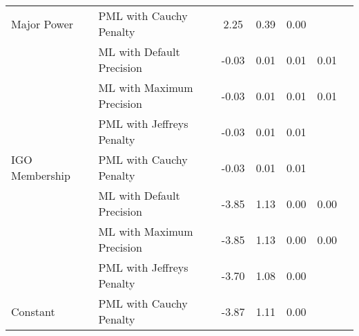 \begin{tabular}{llccccc}
\multirow{-4}{*}{\raggedright\arraybackslash Major Power} & PML with Cauchy Penalty & 2.25 & 0.39 & 0.00 &  & \\
\cmidrule{1-7}
 & ML with Default Precision & -0.03 & 0.01 & 0.01 & 0.01 & \\

 & ML with Maximum Precision & -0.03 & 0.01 & 0.01 & 0.01 & \\

 & PML with Jeffreys Penalty & -0.03 & 0.01 & 0.01 &  & \\

\multirow{-4}{*}{\raggedright\arraybackslash IGO Membership} & PML with Cauchy Penalty & -0.03 & 0.01 & 0.01 &  & \\
\cmidrule{1-7}
 & ML with Default Precision & -3.85 & 1.13 & 0.00 & 0.00 & \\

 & ML with Maximum Precision & -3.85 & 1.13 & 0.00 & 0.00 & \\

 & PML with Jeffreys Penalty & -3.70 & 1.08 & 0.00 &  & \\

\multirow{-4}{*}{\raggedright\arraybackslash Constant} & PML with Cauchy Penalty & -3.87 & 1.11 & 0.00 &  & \\
\bottomrule
\end{tabular}